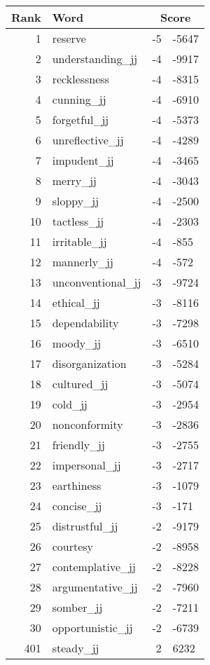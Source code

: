\begin{longtable}[!htbp]{| rlr@{.}l |}
    \hline
    \textbf{Rank} & \textbf{Word} & \multicolumn{2}{c|}{\textbf{Score}} \\
    \hline
    \endhead
    1 & reserve & -5 & -5647 \\
    2 & understanding\_jj & -4 & -9917 \\
    3 & recklessness & -4 & -8315 \\
    4 & cunning\_jj & -4 & -6910 \\
    5 & forgetful\_jj & -4 & -5373 \\
    6 & unreflective\_jj & -4 & -4289 \\
    7 & impudent\_jj & -4 & -3465 \\
    8 & merry\_jj & -4 & -3043 \\
    9 & sloppy\_jj & -4 & -2500 \\
    10 & tactless\_jj & -4 & -2303 \\
    11 & irritable\_jj & -4 & -855 \\
    12 & mannerly\_jj & -4 & -572 \\
    13 & unconventional\_jj & -3 & -9724 \\
    14 & ethical\_jj & -3 & -8116 \\
    15 & dependability & -3 & -7298 \\
    16 & moody\_jj & -3 & -6510 \\
    17 & disorganization & -3 & -5284 \\
    18 & cultured\_jj & -3 & -5074 \\
    19 & cold\_jj & -3 & -2954 \\
    20 & nonconformity & -3 & -2836 \\
    21 & friendly\_jj & -3 & -2755 \\
    22 & impersonal\_jj & -3 & -2717 \\
    23 & earthiness & -3 & -1079 \\
    24 & concise\_jj & -3 & -171 \\
    25 & distrustful\_jj & -2 & -9179 \\
    26 & courtesy & -2 & -8958 \\
    27 & contemplative\_jj & -2 & -8228 \\
    28 & argumentative\_jj & -2 & -7960 \\
    29 & somber\_jj & -2 & -7211 \\
    30 & opportunistic\_jj & -2 & -6739 \\
    401 & steady\_jj & 2 & 6232 \\

\end{longtable}
